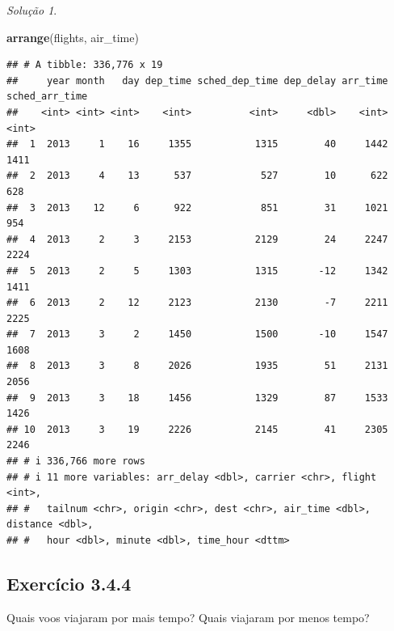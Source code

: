 \documentclass[
]{latex/krantz}
\newenvironment{Shaded}{\begin{snugshade}}{\end{snugshade}}
\newcommand{\FunctionTok}[1]{\textcolor[rgb]{0.13,0.29,0.53}{\textbf{#1}}}
\newcommand{\NormalTok}[1]{#1}
\theoremstyle{definition}
\theoremstyle{definition}
\theoremstyle{definition}
\theoremstyle{definition}
\theoremstyle{remark}
\newtheorem*{solution}{Solução}
\begin{document}
\begin{solution}
\leavevmode

\begin{Shaded}
\begin{Highlighting}[]
\FunctionTok{arrange}\NormalTok{(flights, air\_time)}
\end{Highlighting}
\end{Shaded}

\begin{verbatim}
## # A tibble: 336,776 x 19
##     year month   day dep_time sched_dep_time dep_delay arr_time sched_arr_time
##    <int> <int> <int>    <int>          <int>     <dbl>    <int>          <int>
##  1  2013     1    16     1355           1315        40     1442           1411
##  2  2013     4    13      537            527        10      622            628
##  3  2013    12     6      922            851        31     1021            954
##  4  2013     2     3     2153           2129        24     2247           2224
##  5  2013     2     5     1303           1315       -12     1342           1411
##  6  2013     2    12     2123           2130        -7     2211           2225
##  7  2013     3     2     1450           1500       -10     1547           1608
##  8  2013     3     8     2026           1935        51     2131           2056
##  9  2013     3    18     1456           1329        87     1533           1426
## 10  2013     3    19     2226           2145        41     2305           2246
## # i 336,766 more rows
## # i 11 more variables: arr_delay <dbl>, carrier <chr>, flight <int>,
## #   tailnum <chr>, origin <chr>, dest <chr>, air_time <dbl>, distance <dbl>,
## #   hour <dbl>, minute <dbl>, time_hour <dttm>
\end{verbatim}

\end{solution}

\hypertarget{exr3-4-4}{%
\subsection*{Exercício 3.4.4}\label{exr3-4-4}}

Quais voos viajaram por mais tempo? Quais viajaram por menos tempo?
\end{document}

